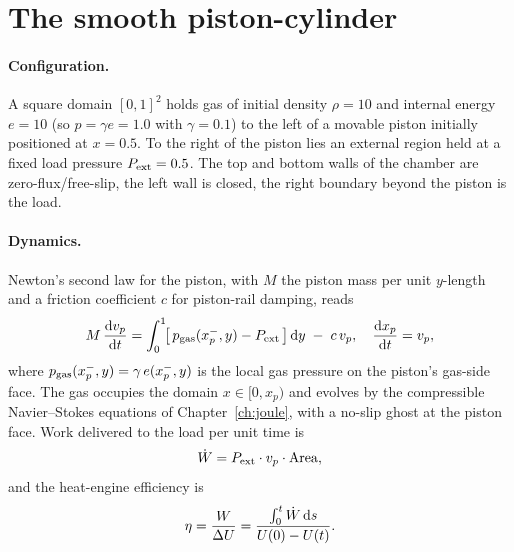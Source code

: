\section{The smooth piston-cylinder}\label{sec:piston-smooth}

\paragraph{Configuration.}
A square domain $[0, 1]^2$ holds gas of initial density $\rho = 10$ and
internal energy $e = 10$ (so $p = \gamma e = 1.0$ with $\gamma = 0.1$)
to the left of a movable piston initially positioned at $x = 0.5$. To
the right of the piston lies an external region held at a fixed load
pressure $P_{\rm ext} = 0.5$. The top and bottom walls of the chamber
are zero-flux/free-slip, the left wall is closed, the right boundary
beyond the piston is the load.

\paragraph{Dynamics.}
Newton's second law for the piston, with $M$ the piston mass per unit
$y$-length and a friction coefficient $c$ for piston-rail damping, reads
\begin{equation}\label{eq:piston-newton}
M\,\frac{\mathrm{d} v_p}{\mathrm{d} t} = \int_{0}^{1}\!\bigl[\,p_{\rm gas}(x_p^-, y) - P_{\rm ext}\,\bigr]\,\mathrm{d} y \;-\; c\,v_p,
\quad \frac{\mathrm{d} x_p}{\mathrm{d} t} = v_p,
\end{equation}
where $p_{\rm gas}(x_p^-, y) = \gamma\,e(x_p^-, y)$ is the local
gas pressure on the piston's gas-side face. The gas occupies the
domain $x \in [0, x_p)$ and evolves by the compressible
Navier--Stokes equations of Chapter~\ref{ch:joule}, with a no-slip
ghost at the piston face. Work delivered to the load per unit time is
\begin{equation}\label{eq:piston-power}
\dot W = P_{\rm ext} \cdot v_p \cdot \mathrm{Area},
\end{equation}
and the heat-engine efficiency is
\begin{equation}\label{eq:piston-eta}
\eta = \frac{W}{\Delta U} = \frac{\int_0^t \dot W\,\mathrm{d} s}{U(0) - U(t)}.
\end{equation}

